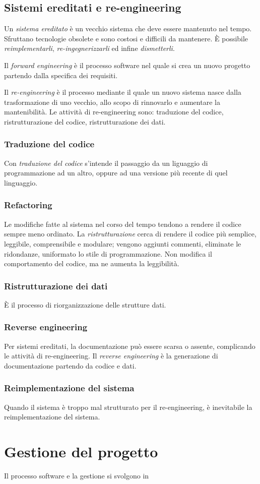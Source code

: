 \documentclass[11pt]{article}
\begin{document}
\subsection{Sistemi ereditati e re-engineering}
Un \textit{sistema ereditato} è un vecchio sistema che deve essere mantenuto nel tempo. Sfruttano tecnologie obsolete e 
sono costosi e difficili da mantenere.
È possibile \textit{reimplementarli}, \textit{re-ingegnerizzarli} ed infine \textit{dismetterli}.

Il \textit{forward engineering} è il processo software nel quale si crea un nuovo progetto partendo dalla specifica dei 
requisiti.

Il \textit{re-engineering} è il processo mediante il quale un nuovo sistema nasce dalla trasformazione di uno vecchio, allo 
scopo di rinnovarlo e aumentare la mantenibilità. Le attività di re-engineering sono: traduzione del codice, ristrutturazione 
del codice, ristrutturazione dei dati.
\subsubsection*{Traduzione del codice}
Con \textit{traduzione del codice} s'intende il passaggio da un liguaggio di programmazione ad un altro, oppure ad una 
versione più recente di quel linguaggio.
\subsubsection*{Refactoring}
Le modifiche fatte al sistema nel corso del tempo tendono a rendere il codice sempre meno ordinato. La \textit{ristrutturazione}
cerca di rendere il codice più semplice, leggibile, comprensibile e modulare; vengono aggiunti commenti, eliminate le 
ridondanze, uniformato lo stile di programmazione. Non modifica il comportamento del codice, ma ne aumenta la leggibilità.
\subsubsection*{Ristrutturazione dei dati}
È il processo di riorganizzazione delle strutture dati.
\subsubsection*{Reverse engineering}
Per sistemi ereditati, la documentazione può essere scarsa o assente, complicando le attività di re-engineering. 
Il \textit{reverse engineering} è la generazione di documentazione partendo da codice e dati.
\subsubsection*{Reimplementazione del sistema}
Quando il sistema è troppo mal strutturato per il re-engineering, è inevitabile la reimplementazione del sistema. 
\section{Gestione del progetto}
Il processo software e la gestione si svolgono in 
\end{document}
